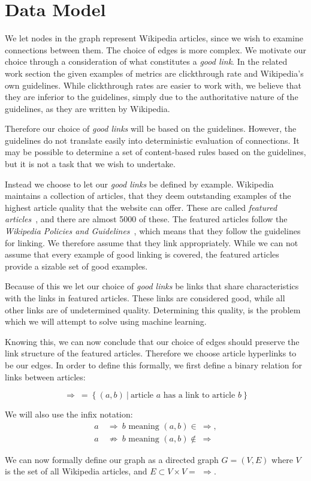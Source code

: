 \section{Data Model}\label{sec:choice_of_graph}

We let nodes in the graph represent Wikipedia articles, since we wish to examine connections between them. The choice of edges is more complex. We motivate our choice through a consideration of what constitutes a \emph{good link}. In the related work section the given examples of metrics are clickthrough rate and Wikipedia's own guidelines. While clickthrough rates are easier to work with, we believe that they are inferior to the guidelines, simply due to the authoritative nature of the guidelines, as they are written by Wikipedia. 

Therefore our choice of \emph{good links} will be based on the guidelines. However, the guidelines do not translate easily into deterministic evaluation of connections. It may be possible to determine a set of content-based rules based on the guidelines, but it is not a task that we wish to undertake.

Instead we choose to let our \emph{good links} be defined by example. Wikipedia maintains a collection of articles, that they deem outstanding examples of the highest article quality that the website can offer. These are called \emph{featured articles}~\cite{wiki-featured-articles}, and there are almost 5000 of these. The featured articles follow the \emph{Wikipedia Policies and Guidelines}~\cite{wiki-editor-guidelines}, which means that they follow the guidelines for linking. We therefore assume that they link appropriately. While we can not assume that every example of good linking is covered, the featured articles provide a sizable set of good examples.

Because of this we let our choice of \emph{good links} be links that share characteristics with the links in featured articles. These links are considered good, while all other links are of undetermined quality. Determining this quality, is the problem which we will attempt to solve using machine learning.

Knowing this, we can now conclude that our choice of edges should preserve the link structure of the featured articles. Therefore we choose article hyperlinks to be our edges. In order to define this formally, we first define a binary relation for links between articles:

$$\Rightarrow\ =\ \{\ (a,b)\ |\ \text{article } a \text{ has a link to article } b\ \}$$

We will also use the infix notation:
\begin{align*}
a\ &\Rightarrow\ b \text{ meaning } (a,b) \in\ \Rightarrow,\\
a\ &\not\Rightarrow\ b \text{ meaning } (a,b) \not\in\ \Rightarrow
\end{align*}

We can now formally define our graph as a directed graph $G = (V,E)$ where $V$ is the set of all Wikipedia articles, and $E\subset V \times V = \ \, \Rightarrow$.